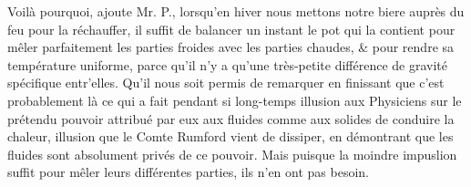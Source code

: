 Voilà pourquoi, ajoute Mr. P., lorsqu'en hiver nous mettons notre biere auprès du feu pour la réchauffer, il suffit de balancer un instant le pot qui la contient pour mêler parfaitement les parties froides avec les parties chaudes, & pour rendre sa température uniforme, parce qu'il n'y a qu'une très-petite différence de gravité spécifique entr'elles.
Qu'il nous soit permis de remarquer en finissant que c'est probablement là ce qui a fait pendant si long-temps illusion aux Physiciens sur le prétendu pouvoir attribué par eux aux fluides comme aux solides de conduire la chaleur, illusion que le Comte Rumford vient de dissiper, en démontrant que les fluides sont absolument privés de ce pouvoir. Mais puisque la moindre impuslion suffit pour mêler leurs différentes parties, ils n'en ont pas besoin.
